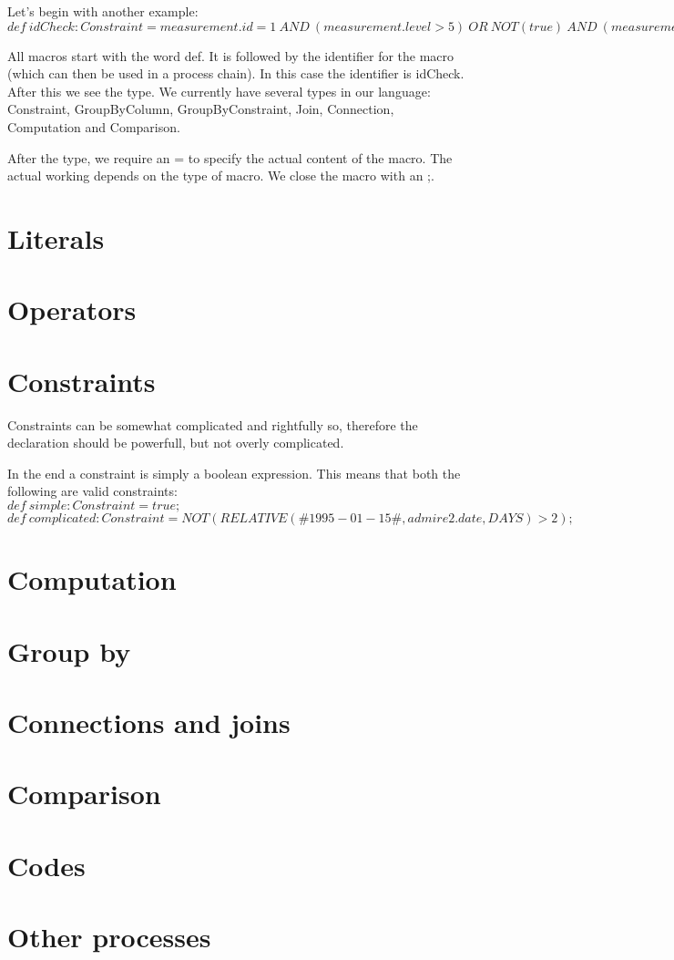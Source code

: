 \documentclass[a4paper]{article}
\begin{document}
Let's begin with another example: \\

$def\ idCheck : Constraint = measurement.id = 1\ AND\ (measurement.level > 5)\ OR\ NOT(true)\ AND\ (measurement.level > measurement.value);$

All macros start with the word def. It is followed by the identifier for the macro (which can then be used in a process chain). In this case the identifier is idCheck. After this we see the type. We currently have several types in our language: Constraint, GroupByColumn, GroupByConstraint, Join, Connection, Computation and Comparison.

After the type, we require an = to specify the actual content of the macro. The actual working depends on the type of macro. We close the macro with an ;.

\section{Literals}


\section{Operators}


\section{Constraints}
Constraints can be somewhat complicated and rightfully so, therefore the declaration should be powerfull, but not overly complicated.

In the end a constraint is simply a boolean expression. This means that both the following are valid constraints: \\

$def\ simple : Constraint = true;$ \\

$def\ complicated : Constraint = NOT(RELATIVE(\#1995-01-15\#, admire2.date, DAYS) > 2);$

\section{Computation}


\section{Group by}


\section{Connections and joins}


\section{Comparison}


\section{Codes}


\section{Other processes}

\end{document}

